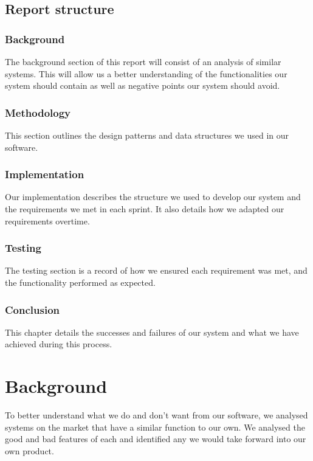 \documentclass[a4paper, oneside, 11pt]{report}
\begin{document}
\section{Report structure}

\subsection {Background}

The background section of this report will consist of an analysis of similar systems. This will allow us a better understanding of the functionalities our system should contain as well as negative points our system should avoid.

\subsection {Methodology}

This section outlines the design patterns and data structures we used in our software.

\subsection {Implementation}

Our implementation describes the structure we used to develop our system and the requirements we met in each sprint. It also details how we adapted our requirements overtime.

\subsection {Testing}

The testing section is a record of how we ensured each requirement was met, and the functionality performed as expected.

\subsection {Conclusion}

This chapter details the successes and failures of our system and what we have achieved during this process.

\chapter{Background}

To better understand what we do and don't want from our software, we analysed systems on the market that have a similar function to our own. We analysed the good and bad features of each and identified any we would take forward into our own product.
\end{document}
